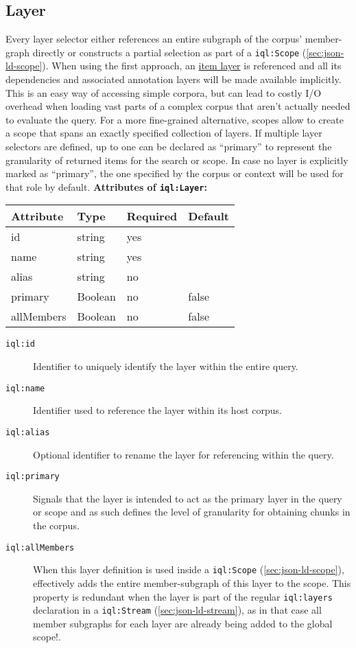 \documentclass[11pt,a4paper,portrait]{article}
\newcommand{\iqlns}{iql:}
\newcommand{\repoUrl}{https://github.com/ICARUS-tooling/icarus2-modeling-framework/blob/dev/}
\newcommand{\modelsUrl}{\repoUrl icarus2-model-api/src/main/java/de/ims/icarus2/model/api/}
\newcommand{\repoLink}[2]{\href{#1}{#2}}
\newcommand{\iqlType}[1]{\texttt{\iqlns#1}}
\newcommand{\desc}[1]{\noindent#1\newline\medskip}
\newenvironment{attributes}[1]{
\noindent\textbf{Attributes of #1:}\newline\medskip
\begin{tabular}{|p{0.3\textwidth}|p{0.20\textwidth}|p{0.20\textwidth}|p{0.17\textwidth}|}
	\hline
	\textbf{Attribute} & \textbf{Type} & \textbf{Required} & \textbf{Default} \\ 
	\hline
	\hline
}{
\end{tabular}
}
\newcommand{\attribute}[4]{
	#1 & #2 & #3 & #4 \\
	\hline
}
\begin{document}
\subsection{Layer}
\label{sec:json-ld-layer}
\desc{Every layer selector either references an entire subgraph of the corpus' member-graph directly or constructs a partial selection as part of a \iqlType{Scope} (\ref{sec:json-ld-scope}). 
When using the first approach, an \repoLink{\modelsUrl layer/ItemLayer.java}{item layer} is referenced and all its dependencies and associated annotation layers will be made available implicitly. 
This is an easy way of accessing simple corpora, but can lead to costly I/O overhead when loading vast parts of a complex corpus that aren't actually needed to evaluate the query. 
For a more fine-grained alternative, scopes allow to create a scope that spans an exactly specified collection of layers. 
If multiple layer selectors are defined, up to one can be declared as ``primary'' to represent the granularity of returned items for the search or scope.
In case no layer is explicitly marked as ``primary'', the one specified by the corpus or context will be used for that role by default.}
\begin{attributes}{\iqlType{Layer}}
	\attribute{id}{string}{yes}{}
	\attribute{name}{string}{yes}{}
	\attribute{alias}{string}{no}{}
	\attribute{primary}{Boolean}{no}{false}
	\attribute{allMembers}{Boolean}{no}{false}
\end{attributes}
\begin{description}
	\item[\iqlType{id}] Identifier to uniquely identify the layer within the entire query.
	\item[\iqlType{name}] Identifier used to reference the layer within its host corpus.
	\item[\iqlType{alias}] Optional identifier to rename the layer for referencing within the query.
	\item[\iqlType{primary}] Signals that the layer is intended to act as the primary layer in the query or scope and as such defines the level of granularity for obtaining chunks in the corpus.
	\item[\iqlType{allMembers}] When this layer definition is used inside a \iqlType{Scope} (\ref{sec:json-ld-scope}), effectively adds the entire member-subgraph of this layer to the scope. This property is redundant when the layer is part of the regular \iqlType{layers} declaration in a \iqlType{Stream} (\ref{sec:json-ld-stream}), as in that case all member subgraphs for each layer are already being added to the global scope!.
\end{description}
\end{document}
